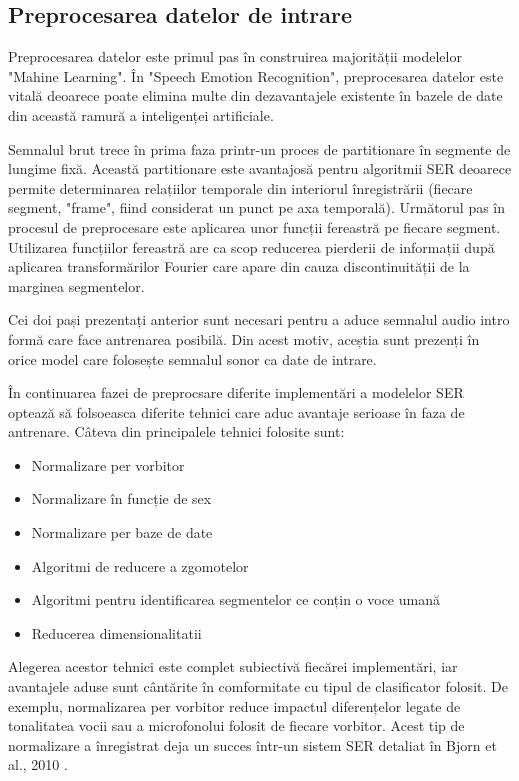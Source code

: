 \documentclass[a4paper,12pt]{book}
\begin{document}
					\subsection{Preprocesarea datelor de intrare}
						Preprocesarea datelor este primul pas în construirea majorității modelelor "Mahine Learning". În "Speech Emotion Recognition", preprocesarea datelor este vitală deoarece poate elimina multe din dezavantajele existente în bazele de date din această ramură a inteligenței artificiale.\par
						Semnalul brut trece în prima faza printr-un proces de partitionare în segmente de lungime fixă. Această partitionare este avantajosă pentru algoritmii SER deoarece permite determinarea relațiilor temporale din interiorul înregistrării (fiecare segment, "frame", fiind considerat un punct pe axa temporală). Următorul pas în procesul de preprocesare este aplicarea unor funcții fereastră pe fiecare segment. Utilizarea funcțiilor fereastră are ca scop reducerea pierderii de informații după aplicarea transformărilor Fourier care apare din cauza discontinuității de la marginea segmentelor. \par
						Cei doi pași prezentați anterior sunt necesari pentru a aduce semnalul audio intro formă care face antrenarea posibilă. Din acest motiv, aceștia sunt prezenți în orice model care folosește semnalul sonor ca date de intrare. \par
						În continuarea fazei de preprocsare diferite implementări a modelelor SER optează să folsoeasca diferite tehnici care aduc avantaje serioase în faza de antrenare. Câteva din principalele tehnici folosite sunt:
						\begin{itemize}
							\setlength\itemsep{0pt}
							\setlength{\itemindent}{1.5cm}
							\item Normalizare per vorbitor
							\item Normalizare în funcție de sex
							\item Normalizare per baze de date
							\item Algoritmi de reducere a zgomotelor
							\item Algoritmi pentru identificarea segmentelor ce conțin o voce umană
							\item Reducerea dimensionalitatii
						\end{itemize}	
						Alegerea acestor tehnici este complet subiectivă fiecărei implementări, iar avantajele aduse sunt cântărite în comformitate cu tipul de clasificator folosit. De exemplu, normalizarea per vorbitor reduce impactul diferențelor legate de tonalitatea vocii sau a microfonolui folosit de fiecare vorbitor. Acest tip de normalizare a înregistrat deja un succes într-un sistem SER detaliat în Bjorn et al., 2010 \cite{spnorm}.
\end{document}
